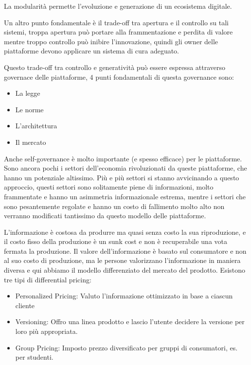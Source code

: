 \documentclass[]{article}
\begin{document}
La modularità permette l'evoluzione e generazione di un ecosistema
digitale.

Un altro punto fondamentale è il trade-off tra apertura e il controllo
su tali sistemi, troppa apertura può portare alla frammentazione e
perdita di valore mentre troppo controllo può inibire l'innovazione,
quindi gli owner delle piattaforme devono applicare un sistema di cura
adeguato.

Questo trade-off tra controllo e generatività può essere espressa
attraverso governace delle piattaforme, 4 punti fondamentali di questa
governance sono:

\begin{itemize}
	 
	\item
	La legge
	\item
	Le norme
	\item
	L'architettura
	\item
	Il mercato
\end{itemize}

Anche self-governance è molto importante (e spesso efficace) per le
piattaforme. Sono ancora pochi i settori dell'economia rivoluzionati da
queste piattaforme, che hanno un potenziale altissimo. Più e più settori
si stanno avvicinando a questo approccio, questi settori sono
solitamente piene di informazioni, molto frammentate e hanno un
asimmetria informazionale estrema, mentre i settori che sono
pesantemente regolate e hanno un costo di fallimento molto alto non
verranno modificati tantissimo da questo modello delle piattaforme.

L'informazione è costosa da produrre ma quasi senza costo la sua
riproduzione, e il costo fisso della produzione è un sunk cost e non è
recuperabile una vota fermata la produzione. Il valore dell'informazione
è basato sul consumatore e non al suo costo di produzione, ma le persone
valorizzano l'informazione in maniera diversa e qui abbiamo il modello
differenziato del mercato del prodotto. Esistono tre tipi di
differential pricing:

\begin{itemize}
	 
	\item
	Personalized Pricing: Valuto l'informazione ottimizzato in base a
	ciascun cliente
	\item
	Versioning: Offro una linea prodotto e lascio l'utente decidere la
	versione per loro più appropriata.
	\item
	Group Pricing: Imposto prezzo diversificato per gruppi di consumatori,
	es. per studenti.
\end{itemize}
\end{document}
